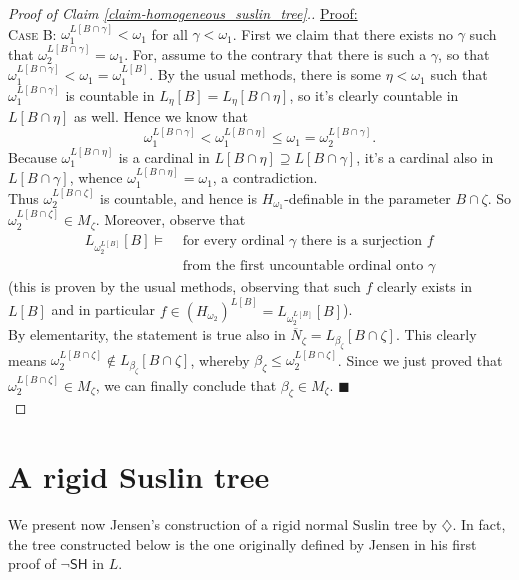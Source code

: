 \documentclass[11pt,a4paper]{report}
\theoremstyle{definition}
\theoremstyle{num.custom-title}
\theoremstyle{custom-title}
\newenvironment{claimproof}[1]{\par\noindent\underline{Proof:}\space#1}{\leavevmode\unskip\penalty9999 \hbox{}\nobreak\hfill\quad\hbox{$\blacksquare$}} %
\newcommand{\nSH}{\ensuremath{\neg\mathsf{SH}}\xspace}
\newcommand{\ol}{\overline}
\begin{document}
\begin{proof}[Proof of Claim \ref{claim-homogeneous_suslin_tree}.]
\begin{claimproof}
\\[6pt]
\textsc{Case B:} $\omega_1^{L[B \cap \gamma]} < \omega_1$ for all $\gamma < \omega_1$. First we claim that there exists no $\gamma$ such that $\omega_2^{L[B \cap \gamma]} = \omega_1$. For, assume to the contrary that there is such a $\gamma$, so that $\omega_1^{L[B \cap \gamma]} < \omega_1 = \omega_1^{L[B]}$. By the usual methods, there is some $\eta < \omega_1$ such that $\omega_1^{L[B \cap \gamma]}$ is countable in $L_\eta [B] = L_\eta [B \cap \eta]$, so it's clearly countable in $L[B \cap \eta]$ as well.
Hence we know that
\[
\omega_1^{L[B \cap \gamma]} < \omega_1^{L[B \cap \eta]} \leq \omega_1 = \omega_2^{L[B \cap \gamma]}.
\]
Because $\omega_1^{L[B \cap \eta]}$ is a cardinal in $L[B \cap \eta] \supseteq L[B \cap \gamma]$, it's a cardinal also in $L[B \cap \gamma]$, whence $\omega_1^{L[B \cap \eta]} = \omega_1$, a contradiction.\\
Thus $\omega_2^{L[B \cap \zeta]}$ is countable, and hence is $H_{\omega_1}$-definable in the parameter $B \cap \zeta$. So $\omega_2^{L[B \cap \zeta]} \in M_\zeta$. Moreover, observe that
\begin{align*}
L_{\omega_2^{L[B]}}[B] \models & \text{ for every ordinal $\gamma$ there is a surjection $f$}\\
& \text{ from the first uncountable ordinal onto $\gamma$}
\end{align*}
(this is proven by the usual methods, observing that such $f$ clearly exists in $L[B]$ and in particular $f \in (H_{\omega_2})^{L[B]} = L_{\omega_2^{L[B]}}[B]$).\\
By elementarity, the statement is true also in $\ol{N}_\zeta = L_{\beta_\zeta}[B \cap \zeta]$. This clearly means 
$\omega_2^{L[B \cap \zeta]} \not\in L_{\beta_\zeta}[B \cap \zeta]$, whereby $\beta_\zeta \leq \omega_2^{L[B \cap \zeta]}$. Since we just proved that $\omega_2^{L[B \cap \zeta]} \in M_\zeta$, we can finally conclude that $\beta_\zeta \in M_\zeta$.
\end{claimproof}\\
\end{proof}


\section{A rigid Suslin tree}

We present now Jensen's construction of a rigid normal Suslin tree by $\diamondsuit$. In fact, the tree constructed below is the one originally defined by Jensen in his first proof of \nSH in $L$.
\end{document}
